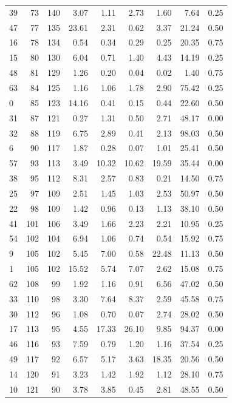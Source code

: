 \begin{tabular}{@{}l r r r r r r r l@{}}
39 & 73 & 140 & 3.07 & 1.11 & 2.73 & 1.60 & 7.64 & 0.25 \\
47 & 77 & 135 & 23.61 & 2.31 & 0.62 & 3.37 & 21.24 & 0.50 \\
16 & 78 & 134 & 0.54 & 0.34 & 0.29 & 0.25 & 20.35 & 0.75 \\
15 & 80 & 130 & 6.04 & 0.71 & 1.40 & 4.43 & 14.19 & 0.25 \\
48 & 81 & 129 & 1.26 & 0.20 & 0.04 & 0.02 & 1.40 & 0.75 \\
63 & 84 & 125 & 1.16 & 1.06 & 1.78 & 2.90 & 75.42 & 0.25 \\
0 & 85 & 123 & 14.16 & 0.41 & 0.15 & 0.44 & 22.60 & 0.50 \\
31 & 87 & 121 & 0.27 & 1.31 & 0.50 & 2.71 & 48.17 & 0.00 \\
32 & 88 & 119 & 6.75 & 2.89 & 0.41 & 2.13 & 98.03 & 0.50 \\
6 & 90 & 117 & 1.87 & 0.28 & 0.07 & 1.01 & 25.41 & 0.50 \\
57 & 93 & 113 & 3.49 & 10.32 & 10.62 & 19.59 & 35.44 & 0.00 \\
38 & 95 & 112 & 8.31 & 2.57 & 0.83 & 0.21 & 14.50 & 0.75 \\
25 & 97 & 109 & 2.51 & 1.45 & 1.03 & 2.53 & 50.97 & 0.50 \\
22 & 98 & 109 & 1.42 & 0.96 & 0.13 & 1.13 & 38.10 & 0.50 \\
41 & 101 & 106 & 3.49 & 1.66 & 2.23 & 2.21 & 10.95 & 0.25 \\
54 & 102 & 104 & 6.94 & 1.06 & 0.74 & 0.54 & 15.92 & 0.75 \\
9 & 105 & 102 & 5.45 & 7.00 & 0.58 & 22.48 & 11.13 & 0.50 \\
1 & 105 & 102 & 15.52 & 5.74 & 7.07 & 2.62 & 15.08 & 0.75 \\
62 & 108 & 99 & 1.92 & 1.16 & 0.91 & 6.56 & 47.02 & 0.50 \\
33 & 110 & 98 & 3.30 & 7.64 & 8.37 & 2.59 & 45.58 & 0.75 \\
30 & 112 & 96 & 1.08 & 0.70 & 0.07 & 2.74 & 28.02 & 0.50 \\
17 & 113 & 95 & 4.55 & 17.33 & 26.10 & 9.85 & 94.37 & 0.00 \\
46 & 116 & 93 & 7.59 & 0.79 & 1.20 & 1.16 & 37.54 & 0.25 \\
49 & 117 & 92 & 6.57 & 5.17 & 3.63 & 18.35 & 20.56 & 0.50 \\
14 & 120 & 91 & 3.23 & 1.42 & 1.92 & 1.12 & 28.10 & 0.75 \\
10 & 121 & 90 & 3.78 & 3.85 & 0.45 & 2.81 & 48.55 & 0.50 \\

\end{tabular}

